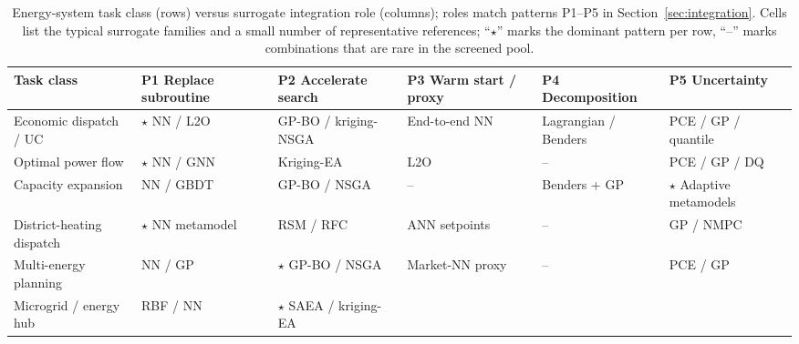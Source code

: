 \begin{table}[!t]
  \centering
  \scriptsize
  \caption{Energy-system task class (rows) versus surrogate integration
  role (columns); roles match patterns P1--P5 in
  Section~\ref{sec:integration}. Cells list the typical surrogate
  families and a small number of representative references; ``$\star$''
  marks the dominant pattern per row, ``--'' marks combinations that
  are rare in the screened pool.}
  \label{tab:T2-task-role}
  \renewcommand{\arraystretch}{1.25}
  \begin{tabularx}{\textwidth}{@{}L{0.16\textwidth} L{0.18\textwidth} L{0.16\textwidth} L{0.16\textwidth} L{0.14\textwidth} L{0.14\textwidth}@{}}
    \toprule
    Task class & P1 Replace subroutine & P2 Accelerate search & P3 Warm start / proxy & P4 Decomposition & P5 Uncertainty \\
    \midrule
    Economic dispatch / UC
      & $\star$ NN / L2O \cite{Wu2022231,Chen20244723,Pang2023}
      & GP-BO / kriging-NSGA \cite{Nikolaidis2021,Lin2023}
      & End-to-end NN \cite{Chen2022,Wu2022231}
      & Lagrangian / Benders \cite{Wu2024391,Zhang2025__4}
      & PCE / GP / quantile \cite{Hu2020,Hu2021671,Chen2023657} \\
    Optimal power flow
      & $\star$ NN / GNN \cite{Chen20244723,Chen2022,Liu20223726}
      & Kriging-EA \cite{Deng2020831,Lin2023}
      & L2O \cite{Li2023__2}
      & --
      & PCE / GP / DQ \cite{Muhlpfordt20194806,Chen2023657,Koirala20242284} \\
    Capacity expansion
      & NN / GBDT \cite{Jahangiri20244849,Pérez-Uresti2023}
      & GP-BO / NSGA \cite{Han2018622,Amaral20251156}
      & --
      & Benders + GP \cite{Zhang2025__4}
      & $\star$ Adaptive metamodels \cite{Fu20202904,Kim2021} \\
    District-heating dispatch
      & $\star$ NN metamodel \cite{Sánchez-Zabala2024,Du2025}
      & RSM / RFC \cite{Schulte2016104,Petrova2025}
      & ANN setpoints \cite{Reynolds2017704}
      & --
      & GP / NMPC \cite{Simonson202036} \\
    Multi-energy planning
      & NN / GP \cite{Zheng20231907,Yin2024,Roth2019214,Gao2025}
      & $\star$ GP-BO / NSGA \cite{Han2018622,Schulte2020,Aghaei Pour2022303}
      & Market-NN proxy \cite{Jalving2023,Wang2020202933}
      & --
      & PCE / GP \cite{Dong2023,Dong2022,Wang2024} \\
    Microgrid / energy hub
      & RBF / NN \cite{Wang2017,Hussien20211883,Li2023__3}
      & $\star$ SAEA / kriging-EA \cite{Deng2020831,Pang2023}

\end{tabularx}
\end{table}
